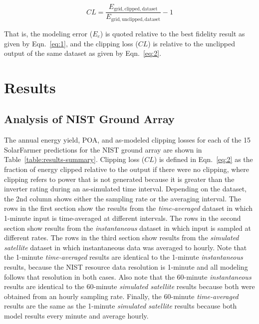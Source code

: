 \documentclass[conference]{IEEEtran}
\begin{document}
\begin{equation} \label{eq:2}
\mathit{CL} = \frac{E_\mathrm{grid,clipped,dataset}}{E_\mathrm{grid,unclipped,dataset}} - 1
\end{equation}

That is, the modeling error ($E_e$) is quoted relative to the best fidelity result as given by Eqn.~\ref{eq:1}, and the clipping loss ($\mathit{CL}$) is relative to the unclipped output of the same dataset as given by Eqn.~\ref{eq:2}.

\section{Results}
\label{section:results}

\subsection{Analysis of NIST Ground Array}
The annual energy yield, POA, and as-modeled clipping losses for each of the 15 SolarFarmer predictions for the NIST ground array are shown in Table~\ref{table:results-summary}. Clipping loss ($\mathit{CL}$) is defined in Eqn.~\ref{eq:2} as the fraction of energy clipped relative to the output if there were no clipping, where clipping refers to power that is not generated because it is greater than the inverter rating during an as-simulated time interval. Depending on the dataset, the 2nd column shows either the sampling rate or the averaging interval. The rows in the first section show the results from the \emph{time-averaged} dataset in which 1-minute input is time-averaged at different intervals. The rows in the second section show results from the \emph{instantaneous} dataset in which input is sampled at different rates. The rows in the third section show results from the \emph{simulated satellite} dataset in which instantaneous data was averaged to hourly. Note that the 1-minute \emph{time-averaged} results are identical to the 1-minute \emph{instantaneous} results, because the NIST resource data resolution is 1-minute and all modeling follows that resolution in both cases. Also note that the 60-minute \emph{instantaneous} results are identical to the 60-minute \emph{simulated satellite} results because both were obtained from an hourly sampling rate. Finally, the 60-minute \emph{time-averaged} results are the same as the 1-minute \emph{simulated satellite} results because both model results every minute and average hourly.
\end{document}
